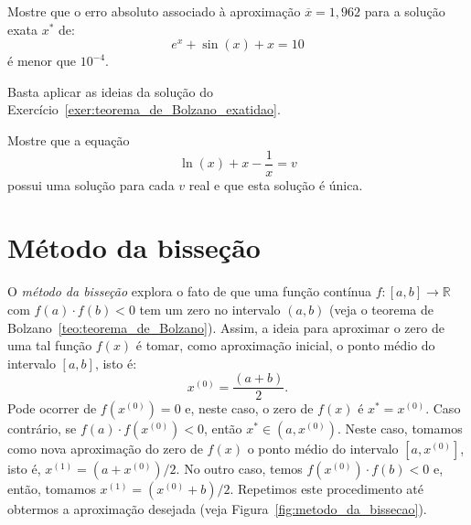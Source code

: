 \begin{ex}
\begin{resp}
\end{resp}

\begin{exer} Mostre que o erro absoluto associado à aproximação $\overline{x} = 1,962$ para a solução exata $x^*$ de:
  \begin{equation}
    e^x+\sin (x) +x = 10
  \end{equation}
é menor que $10^{-4}$.
\end{exer}
\begin{resp}
  Basta aplicar as ideias da solução do Exercício~\ref{exer:teorema_de_Bolzano_exatidao}.
\end{resp}

\begin{exer}\label{existe_unica} Mostre que a equação
  \begin{equation}
    \ln(x)+x-\frac{1}{x}=v
  \end{equation}
possui uma solução para cada $v$ real e que esta solução é única.
\end{exer}

\section{Método da bisseção}

O \emph{método da bisseção} explora o fato de que uma função contínua $f:[a, b]\to \mathbb{R}$ com $f(a)\cdot f(b) < 0$ tem um zero no intervalo $(a, b)$ (veja o teorema de Bolzano~\ref{teo:teorema_de_Bolzano}). Assim, a ideia para aproximar o zero de uma tal função $f(x)$ é tomar, como aproximação inicial, o ponto médio do intervalo $[a, b]$, isto é:
\begin{equation}
  x^{(0)} = \frac{(a + b)}{2}.
\end{equation}
Pode ocorrer de $f(x^{(0)}) = 0$ e, neste caso, o zero de $f(x)$ é $x^* = x^{(0)}$. Caso contrário, se $f(a)\cdot f(x^{(0)}) < 0$, então $x^*\in (a, x^{(0)})$. Neste caso, tomamos como nova aproximação do zero de $f(x)$ o ponto médio do intervalo $[a, x^{(0)}]$, isto é, $x^{(1)} = (a + x^{(0)})/2$. No outro caso, temos $f(x^{(0)})\cdot f(b) < 0$ e, então, tomamos $x^{(1)} = (x^{(0)} + b)/2$. Repetimos este procedimento até obtermos a aproximação desejada (veja Figura~\ref{fig:metodo_da_bissecao}).


\end{ex}
